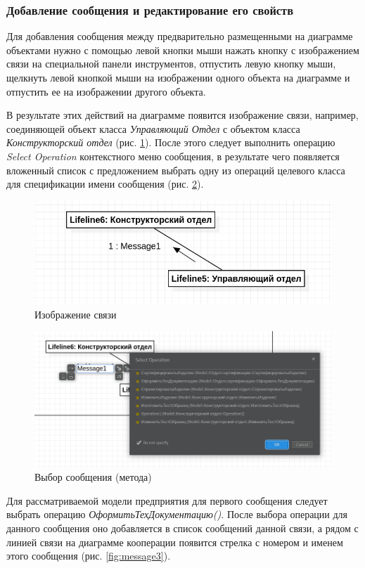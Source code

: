 \documentclass[a4paper,12pt]{report}
\begin{document}
\subsubsection*{Добавление сообщения и редактирование его свойств}
Для добавления сообщения между предварительно размещенными на диаграмме объектами нужно с помощью левой кнопки мыши нажать кнопку с изображением связи на специальной панели инструментов, отпустить левую кнопку мыши, щелкнуть левой кнопкой мыши на изображении одного объекта на диаграмме и отпустить ее на изображении другого объекта.

В результате этих действий на диаграмме появится изображение связи, например, соединяющей объект класса \textit{Управляющий Отдел} с объектом класса \textit{Конструкторский отдел} (рис. \ref{fig:message1}). После этого следует выполнить операцию \textit{Select Operation} контекстного меню сообщения, в результате чего появляется вложенный список с предложением выбрать одну из операций целевого класса для спецификации имени сообщения (рис. \ref{fig:message2}).

\begin{figure}[h!]
	\centering
	\includegraphics[width=0.7\linewidth]{images/message1}
	\caption{Изображение связи}
	\label{fig:message1}
\end{figure}

\begin{figure}[h!]
	\centering
	\includegraphics[width=0.7\linewidth]{images/message2}
	\caption{Выбор сообщения (метода)}
	\label{fig:message2}
\end{figure}

Для рассматриваемой модели предприятия для первого сообщения следует выбрать операцию \textit{ОформитьТехДокументацию()}. После выбора операции для данного сообщения оно добавляется в список сообщений данной связи, а рядом с линией связи на диаграмме кооперации появится стрелка с номером и именем этого сообщения (рис. \ref{fig:message3}).
\end{document}
